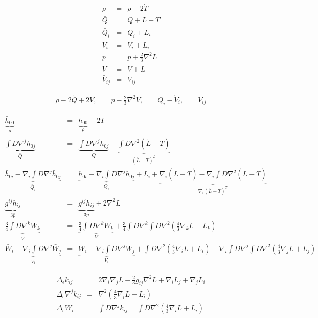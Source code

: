 \documentclass[10pt,letterpaper]{article}
\numberwithin{equation}{section}
\begin{document}
\begin{eqnarray}
\bar\rho &=& \rho -2\dot T
\nonumber\\
\bar Q &=& Q + \dot L-T
\nonumber\\
\bar Q_i &=& Q_i +\dot L_i
\nonumber\\
\bar V_i &=& V_i + L_i
\nonumber\\
\bar p &=& p +\frac23 \nabla^2 L 
\nonumber\\
\bar V &=& V + L
\nonumber\\
\bar V_{ij} &=& V_{ij}
\end{eqnarray}

\begin{eqnarray}
\rho - 2\dot Q + 2\ddot V,\qquad p - \tfrac23 \nabla^2 V,\qquad Q_i -\dot V_i,\qquad V_{ij}
\end{eqnarray}

\begin{eqnarray}
\underbrace{\bar h_{00}}_{\bar\rho} &=& \underbrace{h_{00}}_{\rho} - 2\dot T
\nonumber\\
\underbrace{\int D \nabla^j \bar h_{0j}}_{\bar Q} &=& \underbrace{\int D \nabla^j h_{0j}}_Q + \underbrace{\int D \nabla^2(\dot L-T)}_{(\dot L-T)^L}
\nonumber\\
\underbrace{\bar h_{0i} - \nabla_i \int D \nabla^j \bar h_{0j}}_{\bar Q_i} &=&
\underbrace{h_{0i} - \nabla_i \int D \nabla^j  h_{0j}}_{Q_i} +\dot L_i +\underbrace{ \nabla_i(\dot L -T)
-\nabla_i \int D \nabla^2(\dot L-T)}_{\nabla_i (\dot L-T)^T}
\nonumber\\
\underbrace{g^{ij}\bar h_{ij}}_{3\bar p} &=& \underbrace{g^{ij} h_{ij}}_{3p} + 2\nabla^2 L
\nonumber\\
\underbrace{\frac34 \int D \nabla^k \bar W_k}_{\bar V} &=&\underbrace{ \frac34 \int D \nabla^k W_k }_{V}
+ \frac34 \int D \nabla^k \int D \nabla^2(\tfrac43 \nabla_k  L +  L_k )
\nonumber\\
\underbrace{\bar W_i - \nabla_i \int D \nabla^j \bar W_j}_{\bar V_i}
&=&
\underbrace{ W_i - \nabla_i \int D \nabla^j W_j}_{ V_i}
+ \int D\nabla^2 (\tfrac43 \nabla_i L + L_i) - \nabla_i \int D \nabla^j \int D\nabla^2 (\tfrac43 \nabla_j L + L_j)
\end{eqnarray}

\begin{eqnarray}
\Delta_\epsilon k_{ij} &=& 2\nabla_i \nabla_j L - \tfrac23 g_{ij}\nabla^2 L + \nabla_i L_j + \nabla_j L_i
\nonumber\\
\Delta_\epsilon \nabla^j k_{ij} &=& \nabla^2(\tfrac43 \nabla_i  L +  L_i )
\nonumber\\
\Delta_\epsilon W_i &=& \int D \nabla^{j}k_{ij} = \int D\nabla^2 (\tfrac43 \nabla_i L + L_i)
\end{eqnarray}
\end{document}
